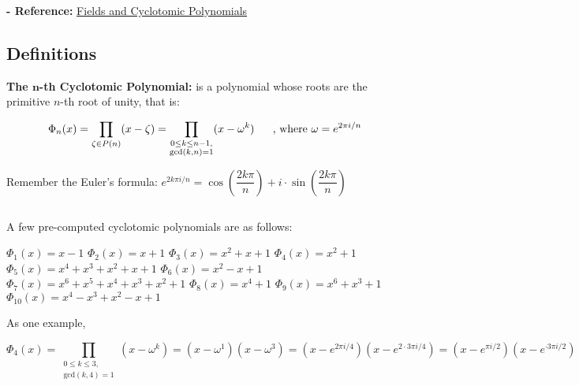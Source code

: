 \textbf{- Reference:} 
\href{https://e.math.cornell.edu/people/belk/numbertheory/CyclotomicPolynomials.pdf}{Fields and Cyclotomic Polynomials}~\cite{cyclotomic-polynomial}

\subsection{Definitions}
\label{subsec:cyclotomic-def}
\begin{tcolorbox}[title={\textbf{\tboxdef{\ref*{subsec:cyclotomic-def}} Cyclotomic Polynomial}}]
 \textbf{The $\bm{n}$-th Cyclotomic Polynomial:} is a polynomial whose roots are the primitive $n$-th root of unity, that is: 
 
 \[ \Phi_n(x) = \prod_{\zeta \in P(n)} (x - \zeta)  = \prod_{\substack{0 \leq k \leq n-1,\\ 
 \text{gcd}(k, n) = 1}} (x - \omega^k) \textcolor{white}{......} \text{, where } \omega = e^{2\pi i/n} \]

 Remember the Euler's formula: $e^{2k\pi i/n} = \cos\left(\dfrac{2k\pi}{n}\right) + i\cdot\sin\left(\dfrac{2k\pi}{n}\right)$

$ $

A few pre-computed cyclotomic polynomials are as follows:
 
\begin{multicols}{2}
$\Phi_1(x) = x - 1$
\newline $\Phi_2(x) = x + 1$
\newline $\Phi_3(x) = x^2 + x + 1$
\newline $\Phi_4(x) = x^2 + 1$
\newline $\Phi_5(x) = x^4 + x^3 + x^2 + x + 1$
\newline $\Phi_6(x) = x^2 - x + 1$
\newline $\Phi_7(x) = x^6 + x^5 + x^4 + x^3 + x^2 + 1$
\newline $\Phi_8(x) = x^4 + 1$
\newline $\Phi_9(x) = x^6 + x^3 + 1$
\newline $\Phi_{10}(x) = x^4 - x^3 + x^2 - x + 1$
\end{multicols}
\end{tcolorbox}


As one example, 

\[\Phi_4(x) = \prod_{\substack{0 \leq k \leq 3,\\ 
 \text{gcd}(k, 4) = 1}} (x - \omega^k) = (x - \omega^1)(x - \omega^3) = (x - e^{2\pi i / 4})(x - e^{2\cdot3\pi i / 4}) = (x - e^{\pi i / 2})(x - e^{\cdot3\pi i / 2})\]


